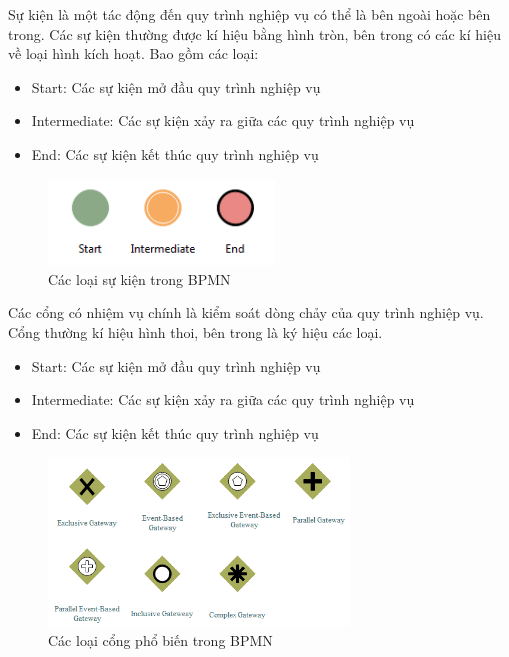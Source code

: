 Sự kiện là một tác động đến quy trình nghiệp vụ có thể là bên ngoài hoặc bên trong. Các sự kiện thường được kí hiệu bằng hình tròn, bên trong có các kí hiệu về loại hình kích hoạt. Bao gồm các loại:
\begin{itemize}
	\item Start: Các sự kiện mở đầu quy trình nghiệp vụ
	\item Intermediate: Các sự kiện xảy ra giữa các quy trình nghiệp vụ
	\item End: Các sự kiện kết thúc quy trình nghiệp vụ
\end{itemize}
\begin{figure}[!htp]
	\begin{center}
		\includegraphics[width=6cm]{img/theory/BPMN/Event.png}
	\end{center}
	\caption{Các loại sự kiện trong BPMN \cite{theoryBPMN1}}
\end{figure}


Các cổng có nhiệm vụ chính là kiểm soát dòng chảy của quy trình nghiệp vụ. Cổng thường kí hiệu hình thoi, bên trong là ký hiệu các loại.
\begin{itemize}
    \item Start: Các sự kiện mở đầu quy trình nghiệp vụ
    \item Intermediate: Các sự kiện xảy ra giữa các quy trình nghiệp vụ
    \item End: Các sự kiện kết thúc quy trình nghiệp vụ
\end{itemize}
\begin{figure}[!htp]
    \begin{center}
        \includegraphics[width=8cm]{img/theory/BPMN/Gateway.png}
    \end{center}
    \caption{Các loại cổng phổ biến trong BPMN \cite{theoryBPMN1}}
\end{figure}



